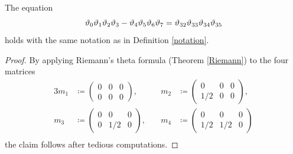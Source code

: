\documentclass[10pt,a4paper]{amsart}
\begin{document}
\begin{Lem}\label{01234567}
The equation
\[
    \vartheta_0\vartheta_1\vartheta_2\vartheta_3 - \vartheta_4\vartheta_5\vartheta_6\vartheta_7 = \vartheta_{32}\vartheta_{33}\vartheta_{34}\vartheta_{35}\smallskip
\]
holds with the same notation {as} in Definition \ref{notation}.
\end{Lem}

\begin{proof}
{By applying Riemann's theta formula (Theorem \ref{Riemann}) to the four matrices}
\begin{alignat*}{3}
    m_1 &\coloneqq \begin{pmatrix}
    0 & 0 & 0\\
    0 & 0 & 0
    \end{pmatrix}, \quad & m_2 &\coloneqq \begin{pmatrix}
    0 & 0 & 0\\
    1/2 & 0 & 0
    \end{pmatrix},\\
    m_3 &\coloneqq \begin{pmatrix}
    0 & 0 & 0\\
    0 & 1/2 & 0
    \end{pmatrix}, \quad & m_4 &\coloneqq \begin{pmatrix}
    0 & 0 & 0\\
    1/2 & 1/2 & 0
    \end{pmatrix}\\[-4.7mm]
\end{alignat*}
the claim follows after tedious computations.
\end{proof}\medskip
\end{document}
